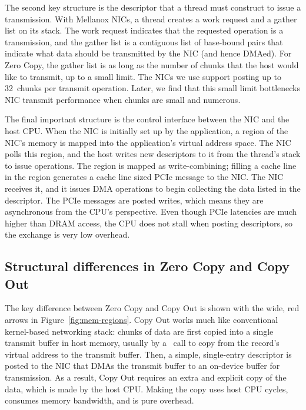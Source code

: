 The second key structure is the descriptor that a thread must construct to
issue a transmission. With Mellanox NICs, a thread creates a work request and a
gather list on its stack. The work request indicates that the requested
operation is a transmission, and the gather list is a contiguous list of
base-bound pairs that indicate what data should be transmitted by the NIC (and
hence DMAed). For Zero Copy, the gather list is as long as the number of chunks
that the host would like to transmit, up to a small limit. The NICs we use support
posting up to 32~chunks per transmit operation. Later, we find that this small
limit bottlenecks NIC transmit performance when chunks are small and numerous.

The final important structure is the control interface between the NIC and the
host CPU.  When the NIC is initially set up by the application, a region of the
NIC's memory is mapped into the application's virtual address space. The NIC
polls this region, and the host writes new descriptors to it from the thread's
stack to issue operations. The region is mapped as write-combining; filling a
cache line in the region generates a cache line sized PCIe message to the NIC.
The NIC receives it, and it issues DMA operations to begin collecting the data
listed in the descriptor. The PCIe messages are posted writes, which means they
are asynchronous from the CPU's perspective. Even though PCIe latencies are much
higher than DRAM access, the CPU does not stall when posting descriptors, so the
exchange is very low overhead.

\subsection{Structural differences in Zero Copy and Copy Out}
The key difference between Zero Copy and Copy Out is shown with the wide, red
arrows in Figure~\ref{fig:mem-regions}. Copy Out works much like conventional
kernel-based networking stack: chunks of data are first copied into a single
transmit buffer in host memory, usually by a \memcpy ~call to copy from the record's 
virtual address to the transmit buffer. Then, a simple, single-entry descriptor is
posted to the NIC that DMAs the transmit buffer to an on-device buffer for transmission.
As a result, Copy Out requires an extra and explicit copy of the data, which is made
by the host CPU.  Making the copy uses host CPU cycles, consumes memory
bandwidth, and is pure overhead. 



